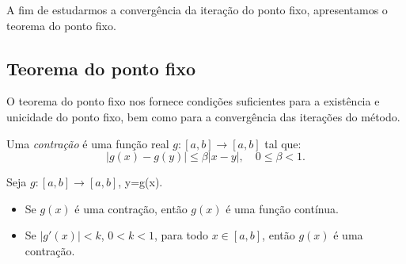 \begin{ex}
\begin{ex}
\end{ex}








A fim de estudarmos a convergência da iteração do ponto fixo, apresentamos o teorema do ponto fixo.

\subsection{Teorema do ponto fixo}

O teorema do ponto fixo nos fornece condições suficientes para a existência e unicidade do ponto fixo, bem como para a convergência das iterações do método.

\begin{defn}
 Uma \emph{contração} é uma função real $g:[a, b]\to [a, b]$ tal que:
 \begin{equation}
   |g(x)-g(y)|\leq \beta |x-y|,\quad 0\leq \beta < 1.
 \end{equation}
\end{defn}

\begin{obs}Seja $g:[a, b]\to [a, b]$, y=g(x).
  \begin{itemize}
  \item Se $g(x)$ é uma contração, então $g(x)$ é uma função contínua.
  \item Se $|g'(x)| < k$, $0 < k < 1$, para todo $x\in [a, b]$, então $g(x)$ é uma contração.
  \end{itemize}
\end{obs}


\end{ex}
